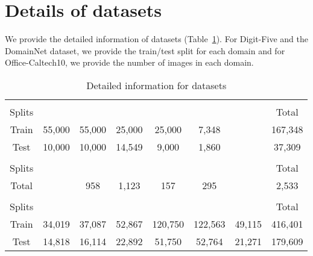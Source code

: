 \documentclass{article}
\newcommand{\BV}[1]{\color{black!10!blue}{\em #1}}
\begin{document}
\section{Details of datasets}
We provide the detailed information of datasets (Table~\ref{tab:dataset_details}). For Digit-Five and the DomainNet dataset, we provide the train/test split for each domain and for Office-Caltech10, we provide the number of images in each domain.
\begin{table}[!ht]
\caption{Detailed information for datasets} \label{tab:dataset_details}
\vspace{0.1in}
\centering

\resizebox{\linewidth}{!}
{
\begin{tabular}{c|ccccccc}

\Xhline{1pt}

\multicolumn{8}{c}{Digit-Five} \\

\Xhline{1pt}

 Splits& {\BV{mnist}} & {\BV{mnist_m}} & {\BV{svhn}} & {\BV{syn}} & {\BV{usps}} & & Total \\
 \hline
 
 Train & 55,000 & 55,000 & 25,000 & 25,000 & 7,348 & & 167,348\\
 Test &  10,000 & 10,000 & 14,549 & 9,000 & 1,860 & & 37,309 \\
 \Xhline{1pt}
 
\multicolumn{8}{c}{Office-Caltech10} \\

\Xhline{1pt}

 Splits &  &{\BV{amazon}} & {\BV{caltech}} & {\BV{dslr}} & {\BV{webcam}}&  & Total \\
\hline
 Total & & 958 & 1,123 & 157 & 295 &  & 2,533 \\
 \Xhline{1pt}
\multicolumn{8}{c}{DomainNet}\\
\Xhline{1pt}
Splits & {\BV{clp}} & {\BV{inf}} & {\BV{pnt}} & {\BV{qdr}} & {\BV{rel}}& {\BV{skt}}& Total \\
 \hline
Train & 34,019 & 37,087 & 52,867 & 120,750 & 122,563 & 49,115 & 416,401 \\
Test & 14,818 & 16,114 & 22,892 & 51,750 & 52,764 & 21,271 & 179,609 \\
\hline
\end{tabular}
}
\end{table} 
\end{document}
